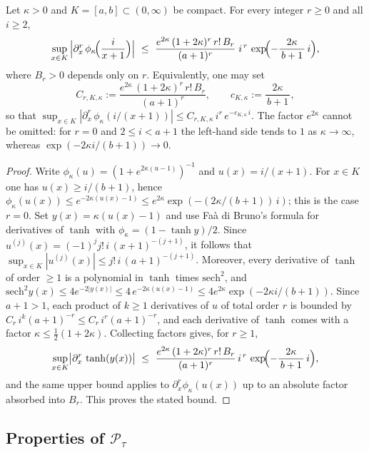 \begin{lemma}\label{lem:cutoff-derivatives}
Let $\kappa>0$ and $K=[a,b]\subset(0,\infty)$ be compact. For every integer $r\ge 0$ and all $i\ge 2$,
\[
\sup_{x\in K}\,\Bigl|\partial_x^r\,\phi_{\kappa}\!\Bigl(\frac{i}{x+1}\Bigr)\Bigr|
\ \le\ \frac{e^{2\kappa}\,(1+2\kappa)^r\,r!\,B_r}{(a+1)^{r}}\; i^{\,r}\, \exp\!\Bigl(-\frac{2\kappa}{\,b+1\,}\, i\Bigr),
\]
where $B_r>0$ depends only on $r$. Equivalently, one may set
\[
C_{r,K,\kappa}:=\frac{e^{2\kappa}\,(1+2\kappa)^r\,r!\,B_r}{(a+1)^{r}},\qquad c_{K,\kappa}:=\frac{2\kappa}{\,b+1\,},
\]
so that $\sup_{x\in K}|\partial_x^r\,\phi_{\kappa}(i/(x+1))|\le C_{r,K,\kappa}\, i^{r}\, e^{-c_{K,\kappa}\, i}$. The factor $e^{2\kappa}$ cannot be omitted: for $r=0$ and $2\le i<a+1$ the left-hand side tends to $1$ as $\kappa\to\infty$, whereas $\exp(-2\kappa i/(b+1))\to0$.
\begin{proof}
Write $\phi_\kappa(u)=(1+e^{2\kappa(u-1)})^{-1}$ and $u(x)=i/(x+1)$. For $x\in K$ one has $u(x)\ge i/(b+1)$, hence $\phi_\kappa(u(x))\le e^{-2\kappa(u(x)-1)}\le e^{2\kappa}\exp(-(2\kappa/(b+1))\,i)$; this is the case $r=0$. Set $y(x)=\kappa(u(x)-1)$ and use Faà di Bruno’s formula for derivatives of $\tanh$ with $\phi_\kappa=(1-\tanh y)/2$. Since $u^{(j)}(x)=(-1)^j j!\,i\,(x+1)^{-(j+1)}$, it follows that $\sup_{x\in K}|u^{(j)}(x)|\le j!\,i\,(a+1)^{-(j+1)}$. Moreover, every derivative of $\tanh$ of order $\ge1$ is a polynomial in $\tanh$ times $\mathrm{sech}^2$, and $\mathrm{sech}^2 y(x)\le 4e^{-2|y(x)|}\le 4\,e^{-2\kappa(u(x)-1)}\le 4e^{2\kappa}\exp(-2\kappa i/(b+1))$. Since $a+1>1$, each product of $k\ge1$ derivatives of $u$ of total order $r$ is bounded by $C_r\,i^{k}(a+1)^{-r}\le C_r\,i^{r}(a+1)^{-r}$, and each derivative of $\tanh$ comes with a factor $\kappa\le\frac12(1+2\kappa)$. Collecting factors gives, for $r\ge1$,
\[
\sup_{x\in K}\bigl|\partial_x^r\,\tanh(y(x))\bigr|\ \le\ \frac{e^{2\kappa}\,(1+2\kappa)^r\,r!\,B_r}{(a+1)^{r}}\,i^{\,r}\,\exp\!\Bigl(-\frac{2\kappa}{\,b+1\,}\,i\Bigr),
\]
and the same upper bound applies to $\partial_x^r\phi_\kappa(u(x))$ up to an absolute factor absorbed into $B_r$. This proves the stated bound.
\end{proof}
\end{lemma}



\subsection{Properties of $\mathcal{P}_{\tau}$}

